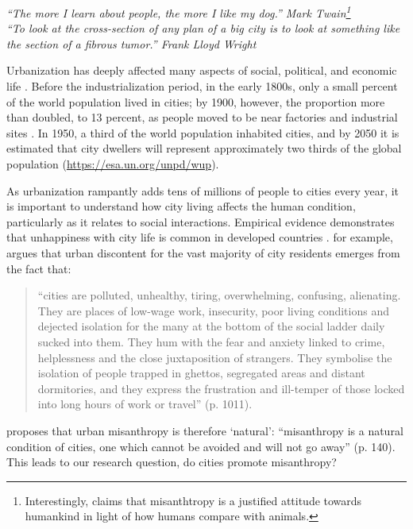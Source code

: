 \documentclass[11pt, letterpaper]{article}
\newcommand{\emd}[1]{\ExecuteMetaData[/tmp/tex]{#1}} %
\begin{document}
\begin{spacing}{1.4} %
\vspace{.25in}

{\small\it \noindent ``The more I learn about people, the more I like my dog.'' Mark
Twain\footnote{Interestingly, \citet{cooper2018animals} claims that misanthtropy is a justified attitude towards humankind in light of how humans %
  compare with animals.}\\[0.3em]
\noindent ``To look at the
 cross-section of any plan of a big city is to look at something like the
 section of a fibrous tumor.'' Frank Lloyd Wright\\}


Urbanization has deeply affected many aspects of social, political, and economic life \citep{kleniewski2010cities}. 
Before the industrialization period, in the early 1800s, only a small percent of the world population lived in cities; by 1900, however, the proportion more than doubled, to 13 percent, as people moved to be near factories and industrial sites
\citep{davis55}. In 1950, a third of the world population inhabited cities, and by 2050 it is estimated that city dwellers will represent approximately two thirds of the global population (\url{https://esa.un.org/unpd/wup}). 
 
As urbanization rampantly adds tens of millions of people to cities every year, it is important to understand how city living affects the human condition, particularly as it relates to social interactions. Empirical evidence demonstrates that unhappiness with city life is common in developed countries \citep{aokCityBook15,sorensen14,morrison17,ala18,aok-val20}. \citet[]{amin06} for example, argues that urban discontent for the vast majority of city residents emerges from the fact that:
\begin{quote}  ``cities are polluted,
  unhealthy, tiring, overwhelming, confusing, alienating. They are places of low-wage work, insecurity, poor living conditions and dejected isolation for the many at the bottom of the social ladder daily sucked into them. They hum with the fear and anxiety linked to crime, helplessness and the close juxtaposition of strangers. They symbolise the isolation of people trapped in ghettos, segregated areas and distant dormitories, and they express the frustration and ill-temper of those locked into long hours of work or travel'' (p. 1011).\end{quote}
 \citet[]{thrift05} proposes that urban misanthropy is therefore `natural': ``misanthropy is a natural condition of cities, one which cannot be avoided and will not go away'' (p. 140). This leads to our research question, do cities promote misanthropy?
  

\end{spacing}
\end{document}
